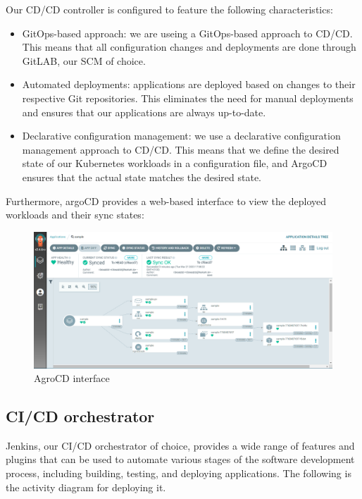 Our CD/CD controller is configured to feature the following characteristics:  
\begin{itemize}[label={--}]
\item GitOps-based approach: we are useing a GitOps-based approach to CD/CD. This means that all configuration changes and deployments are done through GitLAB, our SCM of choice. 
\item Automated deployments: applications are deployed based on changes to their respective Git repositories. This eliminates the need for manual deployments and ensures that our applications are always up-to-date. 
\item Declarative configuration management: we use a declarative configuration management approach to CD/CD. This means that we define the desired state of our Kubernetes workloads in a configuration file, and ArgoCD ensures that the actual state matches the desired state. 
\end{itemize}

Furthermore, argoCD provides a web-based interface to view the deployed workloads and their sync states: 

\begin{figure}[H]\centering
\includegraphics[width=1.0\textwidth,angle=00]{assets/f43.png}
\caption{ AgroCD interface }
\label{fig:AgroCD interface}
\end{figure}
 

\subsection{CI/CD orchestrator }

Jenkins, our CI/CD orchestrator of choice, provides a wide range of features and plugins that can be used to automate various stages of the software development process, including building, testing, and deploying applications. The following is the activity diagram for deploying it. 

